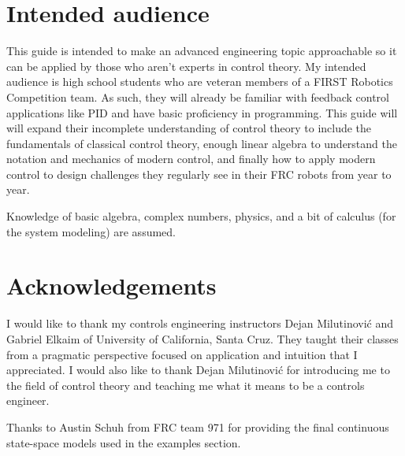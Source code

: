 \section*{Intended audience}

This guide is intended to make an advanced engineering topic approachable so it
can be applied by those who aren't experts in control theory. My intended
audience is high school students who are veteran members of a FIRST Robotics
Competition team. As such, they will already be familiar with feedback control
applications like PID and have basic proficiency in programming. This guide will
will expand their incomplete understanding of control theory to include the
fundamentals of classical control theory, enough linear algebra to understand
the notation and mechanics of modern control, and finally how to apply modern
control to design challenges they regularly see in their FRC robots from year to
year.

Knowledge of basic algebra, complex numbers, physics, and a bit of calculus (for
the system modeling) are assumed.

\section*{Acknowledgements}

I would like to thank my controls engineering instructors Dejan Milutinovi\'c
and Gabriel Elkaim of University of California, Santa Cruz. They taught their
classes from a pragmatic perspective focused on application and intuition that I
appreciated. I would also like to thank Dejan Milutinovi\'c for introducing me
to the field of control theory and teaching me what it means to be a controls
engineer.

Thanks to Austin Schuh from FRC team 971 for providing the final continuous
state-space models used in the examples section.

\cleardoublepage
